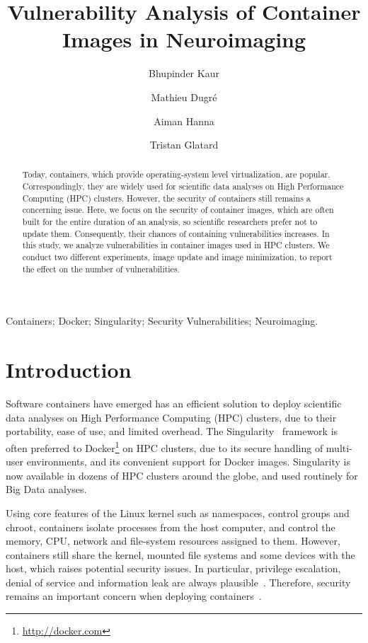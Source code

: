 \documentclass[a4paper,num-refs]{oup-contemporary}
\title{Vulnerability Analysis of Container Images in Neuroimaging}
\begin{document}
\author[1]{Bhupinder Kaur}
\author[1]{Mathieu Dugr\'e}
\author[1]{Aiman Hanna}
\author[1]{Tristan Glatard}

\maketitle

\begin{abstract}

Today, containers, which provide operating-system level virtualization, are
popular. Correspondingly, they are widely used for scientific data analyses on 
High Performance Computing (HPC) clusters. However, the security of containers
still remains a concerning issue. Here, we focus on the security of container
images, which are often built for the entire
duration of an analysis, so scientific researchers prefer not to update
them. Consequently, their chances of containing vulnerabilities increases.  
In this study, we analyze vulnerabilities in container images used in 
HPC clusters.
We conduct two different
experiments, image update and image minimization, to report the effect 
on the number of vulnerabilities.

\end{abstract}

\begin{keywords}
Containers; Docker; Singularity; Security Vulnerabilities; Neuroimaging.
\end{keywords}

\section{Introduction}

Software containers have emerged has an efficient solution to deploy
scientific data analyses on High Performance Computing (HPC) clusters, due
to their portability, ease of use, and limited overhead. The
Singularity~\cite{kurtzer2017singularity} framework is often preferred to
Docker\footnote{\url{http://docker.com}} on HPC clusters, due to its
secure handling of multi-user environments, and its convenient support for
Docker images. Singularity is now available in dozens of HPC
clusters around the globe, and used routinely for Big Data analyses.

Using core features of the Linux kernel such as namespaces, control groups
and chroot, containers isolate processes from the
host computer,  
and control the memory, CPU, network and file-system resources assigned to
them. However, containers still share the kernel, mounted file systems and
some devices with the host, which raises potential security issues. In
particular, privilege escalation, denial of service and information leak
are always plausible~\cite{gantikow2016providing}. Therefore, security remains 
an important concern when deploying containers~\cite{bettini2015vulnerability}.
\end{document}
